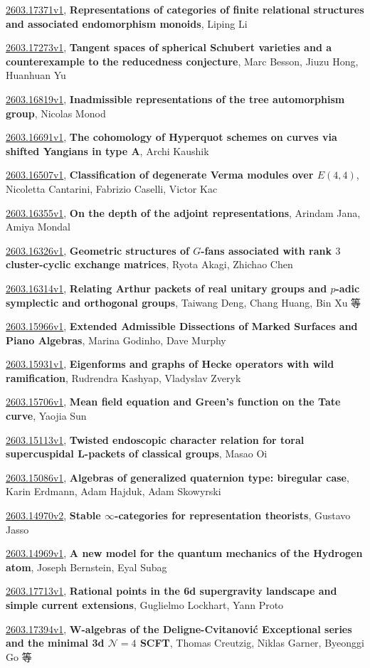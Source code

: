 \documentclass[9pt, a4paper]{article}
\theoremstyle{plain}
\theoremstyle{definition}
\theoremstyle{remark}
\newcommand{\arxiv}[3]{\href{https://arxiv.org/abs/#1}{#1}, \textbf{\textcolor{arxivblue}{#2}}, #3}
\begin{document}
\arxiv{2603.17371v1}{Representations of categories of finite relational structures and associated endomorphism monoids}{Liping Li}

\arxiv{2603.17273v1}{Tangent spaces of spherical Schubert varieties and a counterexample to the reducedness conjecture}{Marc Besson, Jiuzu Hong, Huanhuan Yu}

\arxiv{2603.16819v1}{Inadmissible representations of the tree automorphism group}{Nicolas Monod}

\arxiv{2603.16691v1}{The cohomology of Hyperquot schemes on curves via shifted Yangians in type A}{Archi Kaushik}

\arxiv{2603.16507v1}{Classification of degenerate Verma modules over $E(4,4)$}{Nicoletta Cantarini, Fabrizio Caselli, Victor Kac}

\arxiv{2603.16355v1}{On the depth of the adjoint representations}{Arindam Jana, Amiya Mondal}

\arxiv{2603.16326v1}{Geometric structures of $G$-fans associated with rank $3$ cluster-cyclic exchange matrices}{Ryota Akagi, Zhichao Chen}

\arxiv{2603.16314v1}{Relating Arthur packets of real unitary groups and $p$-adic symplectic and orthogonal groups}{Taiwang Deng, Chang Huang, Bin Xu 等}

\arxiv{2603.15966v1}{Extended Admissible Dissections of Marked Surfaces and Piano Algebras}{Marina Godinho, Dave Murphy}

\arxiv{2603.15931v1}{Eigenforms and graphs of Hecke operators with wild ramification}{Rudrendra Kashyap, Vladyslav Zveryk}

\arxiv{2603.15706v1}{Mean field equation and Green's function on the Tate curve}{Yaojia Sun}

\arxiv{2603.15113v1}{Twisted endoscopic character relation for toral supercuspidal L-packets of classical groups}{Masao Oi}

\arxiv{2603.15086v1}{Algebras of generalized quaternion type: biregular case}{Karin Erdmann, Adam Hajduk, Adam Skowyrski}

\arxiv{2603.14970v2}{Stable $\infty$-categories for representation theorists}{Gustavo Jasso}

\arxiv{2603.14969v1}{A new model for the quantum mechanics of the Hydrogen atom}{Joseph Bernstein, Eyal Subag}

\arxiv{2603.17713v1}{Rational points in the 6d supergravity landscape and simple current extensions}{Guglielmo Lockhart, Yann Proto}

\arxiv{2603.17394v1}{W-algebras of the Deligne-Cvitanović Exceptional series and the minimal 3d ${\mathcal N}=4$ SCFT}{Thomas Creutzig, Niklas Garner, Byeonggi Go 等}
\end{document}
